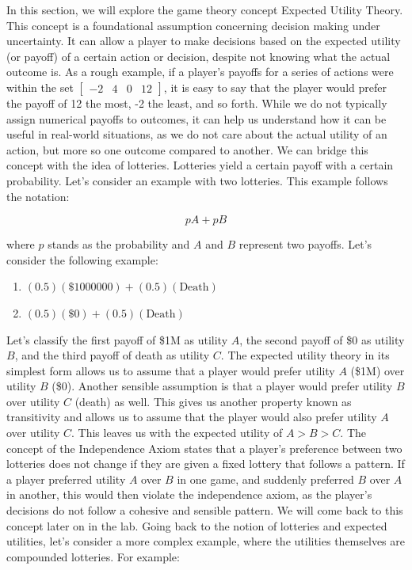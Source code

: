 \documentclass[letterpaper,12pt]{report}
\begin{document}
In this section, we will explore the game theory concept Expected Utility Theory. This concept is a foundational assumption concerning decision making under uncertainty. It can allow a player to make decisions based on the expected utility (or payoff) of a certain action or decision, despite not knowing what the actual outcome is. As a rough example, if a player’s payoffs for a series of actions were within the set $\left[\begin{array}{cccc} -2 & 4 & 0 & 12 \end{array}\right]$, it is easy to say that the player would prefer the payoff of 12 the most, -2 the least, and so forth. While we do not typically assign numerical payoffs to outcomes, it can help us understand how it can be useful in real-world situations, as we do not care about the actual utility of an action, but more so one outcome compared to another. We can bridge this concept with the idea of lotteries. Lotteries yield a certain payoff with a certain probability. Let’s consider an example with two lotteries. This example follows the notation: 

$$ pA + pB $$

where $p$ stands as the probability and $A$ and $B$ represent two payoffs. Let's consider the following example:

\begin{enumerate}
    \item $(0.5)(\$1000000) + (0.5)(\text{Death})$
    \item $(0.5)(\$0) + (0.5)(\text{Death})$
\end{enumerate}

Let’s classify the first payoff of \$1M as utility $A$, the second payoff of \$0 as utility $B$, and the third payoff of death as utility $C$. The expected utility theory in its simplest form allows us to assume that a player would prefer utility $A$ (\$1M) over utility $B$ (\$0). Another sensible assumption is that a player would prefer utility $B$ over utility $C$ (death) as well. This gives us another property known as transitivity and allows us to assume that the player would also prefer utility $A$ over utility $C$. This leaves us with the expected utility of $A > B > C$. The concept of the Independence Axiom states that a player’s preference between two lotteries does not change if they are given a fixed lottery that follows a pattern. If a player preferred utility $A$ over $B$ in one game, and suddenly preferred $B$ over $A$ in another, this would then violate the independence axiom, as the player’s decisions do not follow a cohesive and sensible pattern. We will come back to this concept later on in the lab. Going back to the notion of lotteries and expected utilities, let's consider a more complex example, where the utilities themselves are compounded lotteries. For example:
\end{document}
